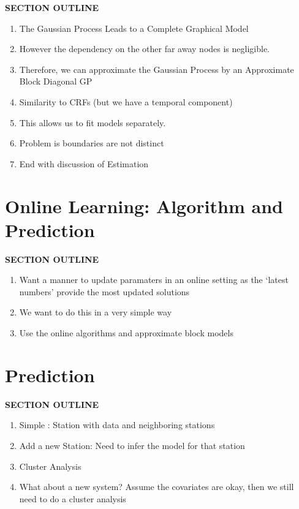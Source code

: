 \documentclass{acm_proc_article-sp}
\begin{document}
\vspace{0.25cm}
{\bf SECTION OUTLINE}
\begin{enumerate}
\item The Gaussian Process Leads to a Complete Graphical Model
\item However the dependency on the other far away nodes is negligible.
\item Therefore, we can approximate the Gaussian Process by an Approximate Block Diagonal GP
\item Similarity to CRFs (but we have a temporal component)
\item This allows us to fit models separately.
\item Problem is boundaries are not distinct
\item End with discussion of Estimation
\end{enumerate}
\vspace{0.5cm}

\section{Online Learning: Algorithm and Prediction}

\vspace{0.25cm}
{\bf SECTION OUTLINE}
\begin{enumerate}
\item Want a manner to update paramaters in an online setting as the `latest numbers' provide the most updated solutions
\item We want to do this in a very simple way
\item Use the online algorithms and approximate block models
\end{enumerate}
\vspace{0.5cm}

\section{Prediction}
{\bf SECTION OUTLINE}
\begin{enumerate}
\item Simple : Station with data and neighboring stations
\item Add a new Station:   Need to infer the model for that station
\item Cluster Analysis
\item What about a new system?  Assume the covariates are okay, then we still need to do a cluster analysis
\end{enumerate}
\vspace{0.5cm}
\end{document}
